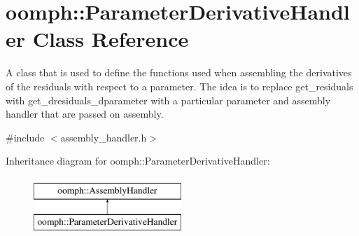 \hypertarget{classoomph_1_1ParameterDerivativeHandler}{}\section{oomph\+:\+:Parameter\+Derivative\+Handler Class Reference}
\label{classoomph_1_1ParameterDerivativeHandler}


A class that is used to define the functions used when assembling the derivatives of the residuals with respect to a parameter. The idea is to replace get\+\_\+residuals with get\+\_\+dresiduals\+\_\+dparameter with a particular parameter and assembly handler that are passed on assembly.  




{\ttfamily \#include $<$assembly\+\_\+handler.\+h$>$}

Inheritance diagram for oomph\+:\+:Parameter\+Derivative\+Handler\+:\begin{figure}[H]
\begin{center}
\leavevmode
\includegraphics[height=2.000000cm]{classoomph_1_1ParameterDerivativeHandler}
\end{center}
\end{figure}
